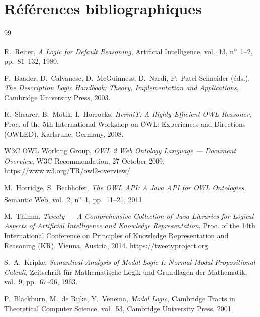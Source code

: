 \chapter*{Références bibliographiques}

\begin{thebibliography}{99}

  R.~Reiter,
  \textit{A Logic for Default Reasoning},
  Artificial Intelligence, vol.~13, n\textsuperscript{o}~1--2,
  pp.~81--132, 1980.

  F.~Baader, D.~Calvanese, D.~McGuinness, D.~Nardi, P.~Patel-Schneider (éds.),
  \textit{The Description Logic Handbook: Theory, Implementation and Applications},
  Cambridge University Press, 2003.

  R.~Shearer, B.~Motik, I.~Horrocks,
  \textit{HermiT: A Highly-Efficient OWL Reasoner},
  Proc. of the 5th International Workshop on OWL: Experiences and Directions (OWLED),
  Karlsruhe, Germany, 2008.

  W3C OWL Working Group,
  \textit{OWL 2 Web Ontology Language — Document Overview},
  W3C Recommendation, 27 October 2009.
  \url{https://www.w3.org/TR/owl2-overview/}

  M.~Horridge, S.~Bechhofer,
  \textit{The OWL API: A Java API for OWL Ontologies},
  Semantic Web, vol.~2, n\textsuperscript{o}~1, pp.~11--21, 2011.

  M.~Thimm,
  \textit{Tweety — A Comprehensive Collection of Java Libraries for
  Logical Aspects of Artificial Intelligence and Knowledge Representation},
  Proc. of the 14th International Conference on Principles of Knowledge
  Representation and Reasoning (KR), Vienna, Austria, 2014.
  \url{https://tweetyproject.org}

  S.~A.~Kripke,
  \textit{Semantical Analysis of Modal Logic I: Normal Modal Propositional Calculi},
  Zeitschrift für Mathematische Logik und Grundlagen der Mathematik,
  vol.~9, pp.~67--96, 1963.

  P.~Blackburn, M.~de Rijke, Y.~Venema,
  \textit{Modal Logic},
  Cambridge Tracts in Theoretical Computer Science, vol.~53,
  Cambridge University Press, 2001.


\end{thebibliography}
